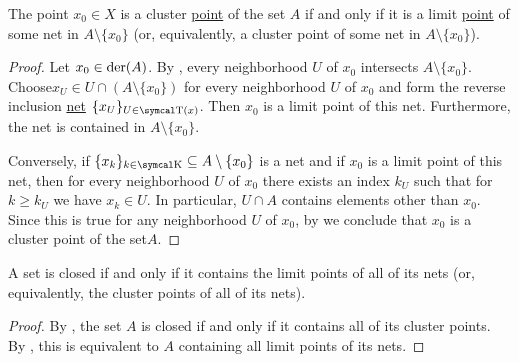\begin{proposition}\label{thm:cluster_point_of_set_iff_limit_point_of_net}
  The point \( x_0 \in X \) is a cluster \hyperref[def:topological_derived_set/cluster_point]{point} of the set \( A \) if and only if it is a limit \hyperref[def:net_convergence/cluster]{point} of some net in \( A \setminus \{ x_0 \} \) (or, equivalently, a cluster point of some net in \( A \setminus \{ x_0 \} \)).
\end{proposition}
\begin{proof}
  \Sufficiency Let \( x_0 \in \operatorname{der}(A) \). By , every neighborhood \( U \) of \( x_0 \) intersects \( A \setminus \{ x_0 \} \). Choose\LEM \( x_U \in U \cap (A \setminus \{ x_0 \}) \) for every neighborhood \( U \) of \( x_0 \) and form the reverse inclusion \hyperref[ex:reverse_inclusion_net]{net} \( \{ x_U \}_{U \in \CT(x)} \). Then \( x_0 \) is a limit point of this net. Furthermore, the net is contained in \( A \setminus \{ x_0 \} \).

  \Necessity Conversely, if \( \{ x_k \}_{k \in \CK} \subseteq A \setminus \{ x_0 \} \) is a net and if \( x_0 \) is a limit point of this net, then for every neighborhood \( U \) of \( x_0 \) there exists an index \( k_U \) such that for \( k \geq k_U \) we have \(  x_k \in U \). In particular, \( U \cap A \) contains elements other than \( x_0 \). Since this is true for any neighborhood \( U \) of \( x_0 \), by  we conclude that \( x_0 \) is a cluster point of the set\( A \).
\end{proof}

\begin{corollary}\label{thm:closed_iff_contains_all_net_cluster_points}
  A set is closed if and only if it contains the limit points of all of its nets (or, equivalently, the cluster points of all of its nets).
\end{corollary}
\begin{proof}
  By , the set \( A \) is closed if and only if it contains all of its cluster points. By , this is equivalent to \( A \) containing all limit points of its nets.
\end{proof}


